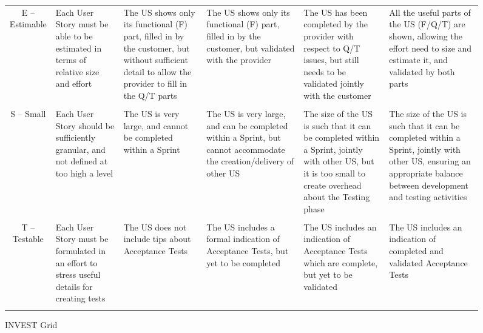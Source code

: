 \begin{figure}
{\begin{tabularx}{25cm}{c  X  X  X  X  X}
 \\
 E – Estimable & Each User Story must be able to be estimated in terms of relative size and effort & The US shows only its functional (F) part, filled in by the customer, but without sufficient detail to allow the provider to fill in the Q/T parts & The US shows only its functional (F) part, filled in by the customer, but validated with the provider  & The US has been completed by the provider with respect to Q/T issues, but still needs to be validated jointly with the customer & All the useful parts of the US (F/Q/T) are shown, allowing the effort need to size and estimate it, and validated by both parts \\

 \\
 S – Small & Each User Story should be sufficiently granular, and not defined at too high a level & The US is very large, and cannot be completed within a Sprint & The US is very large, and can be completed within a Sprint, but cannot accommodate the creation/delivery of other US & The size of the US is such that it can be completed within a Sprint, jointly with other US, but it is too small to create overhead about the Testing phase  & The size of the US is such that it can be completed within a Sprint, jointly with other US, ensuring an appropriate balance between development and testing activities \\

 \\
 T – Testable & Each User Story must be formulated in an effort to stress useful details for creating tests & The US does not include tips about Acceptance Tests & The US includes a formal indication of Acceptance Tests, but yet to be completed & The US includes an indication of Acceptance Tests which are complete, but yet to be validated & The US includes an indication of completed and validated Acceptance Tests \\
 \\
 \hline

\end{tabularx}

}%
\begin{TableCaption}
\caption{INVEST Grid \cite{buglione2013improving}}\label{tb:invest}
\end{TableCaption}
\endgroup
\end{figure}
\restoregeometry
